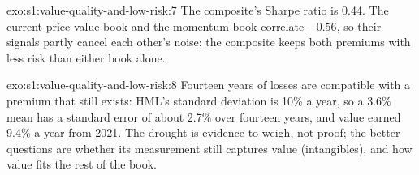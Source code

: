 \begin{solution}{exo:s1:value-quality-and-low-risk:7}
The composite's Sharpe ratio is 0.44. The current-price value book and the momentum book correlate $-0.56$, so their signals partly cancel each other's
noise: the composite keeps both premiums with less risk than either book alone.
\end{solution}

\begin{solution}{exo:s1:value-quality-and-low-risk:8}
Fourteen years of losses are compatible with a premium that still exists: HML's standard deviation is 10\% a year, so a 3.6\% mean has a standard error of
about 2.7\% over fourteen years, and value earned 9.4\% a year from 2021. The drought is evidence to weigh, not proof; the better questions are whether its
measurement still captures value (intangibles), and how value fits the rest of the book.
\end{solution}

